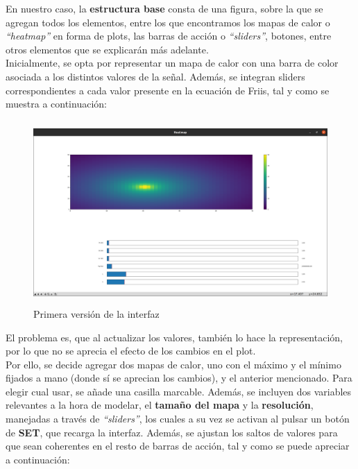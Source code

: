 En nuestro caso, la \textbf{estructura base} consta de una figura, sobre la que se agregan todos los elementos, entre los que encontramos los mapas de calor o \emph{``heatmap''} en forma de plots, las barras de acción o \emph{``sliders''}, botones, entre otros elementos que se explicarán más adelante.\\

Inicialmente, se opta por representar un mapa de calor con una barra de color asociada a los distintos valores de la señal. Además, se integran sliders correspondientes a cada valor presente en la ecuación de Friis, tal y como se muestra a continuación:\\

\begin{figure} [H]
	\begin{center}
	\includegraphics[height=7cm]{imagenes/cap4/6_Friss_firstGUI.png}
	\end{center}
	\caption[Primera versión de la interfaz]{Primera versión de la interfaz}
	\label{fig:friis_init_app}
\end{figure}

El problema es, que al actualizar los valores, también lo hace la representación, por lo que no se aprecia el efecto de los cambios en el plot.\\

Por ello, se decide agregar dos mapas de calor, uno con el máximo y el mínimo fijados a mano (donde sí se aprecian los cambios), y el anterior mencionado. Para elegir cual usar, se añade una casilla marcable. Además, se incluyen dos variables relevantes a la hora de modelar, el \textbf{tamaño del mapa} y la \textbf{resolución}, manejadas a través de \emph{``sliders''}, los cuales a su vez se activan al pulsar un botón de \textbf{SET}, que recarga la interfaz. Además, se ajustan los saltos de valores para que sean coherentes en el resto de barras de acción, tal y como se puede apreciar a continuación:\\

